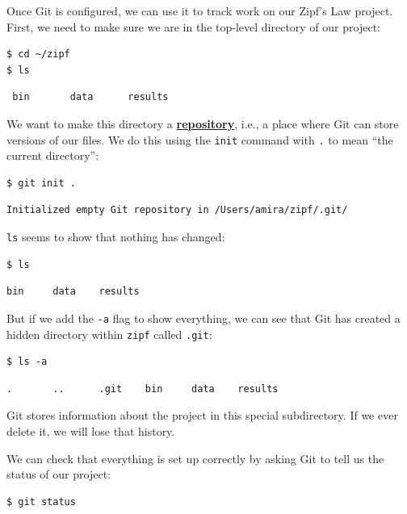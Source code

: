 \documentclass[
]{krantz}
\newcommand{\gref}[2]{\hyperlink{#2}{\textbf{#1}}}
\begin{document}
Once Git is configured,
we can use it to track work on our Zipf's Law project.
First, we need to make sure we are in the top-level directory of our project:

\begin{verbatim}
$ cd ~/zipf
$ ls
\end{verbatim}

\begin{verbatim}
 bin       data      results
\end{verbatim}

We want to make this directory a \gref{repository}{repository},
i.e.,
a place where Git can store versions of our files.
We do this using the \texttt{init} command with \texttt{.} to mean ``the current directory'':

\begin{verbatim}
$ git init .
\end{verbatim}

\begin{verbatim}
Initialized empty Git repository in /Users/amira/zipf/.git/
\end{verbatim}

\texttt{ls} seems to show that nothing has changed:

\begin{verbatim}
$ ls
\end{verbatim}

\begin{verbatim}
bin     data    results
\end{verbatim}

But if we add the \texttt{-a} flag to show everything,
we can see that Git has created a hidden directory within \texttt{zipf} called \texttt{.git}:

\begin{verbatim}
$ ls -a
\end{verbatim}

\begin{verbatim}
.       ..      .git    bin     data    results
\end{verbatim}

Git stores information about the project in this special subdirectory.
If we ever delete it,
we will lose that history.

We can check that everything is set up correctly
by asking Git to tell us the status of our project:

\begin{verbatim}
$ git status
\end{verbatim}
\end{document}
